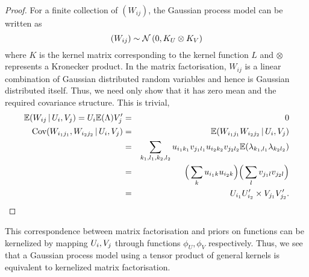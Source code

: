 \begin{proof}
For a finite collection of $(W_{ij})$, the Gaussian process model can be written as
\begin{equation}
(W_{ij}) \sim \mathcal{N}\,(0, K_U \otimes K_V)
\end{equation}
where $K$ is the kernel matrix corresponding to the kernel function $L$ and $\otimes$ represents a Kronecker product.
In the matrix factorisation, $W_{ij}$ is a linear combination of Gaussian distributed random variables and hence is Gaussian distributed itself. Thus, we need only show that it has zero mean and the required covariance structure. This is trivial,
\begin{eqnarray}
\mathbb{E} (W_{ij} \,|\, U_i, V_j) = U_i\mathbb{E}(\Lambda)V_j' & = & 0 \\
\textrm{Cov} (W_{i_1j_1}, W_{i_2j_2} \,|\, U_i, V_j) & = & \mathbb{E} (W_{i_1j_1} W_{i_2j_2} \,|\, U_i, V_j ) \nonumber \\
& = & \sum_{k_1,l_1,k_2,l_2} u_{i_1k_1}v_{j_1l_1}u_{i_2k_2}v_{j_2l_2}\mathbb{E}(\lambda_{k_1,l_1}\lambda_{k_2l_2}) \nonumber \\
& = & \Big(\sum_k u_{i_1k}u_{i_2k}\Big)\Big(\sum_l v_{j_1l}v_{j_2l}\Big) \nonumber \\
& = & U_{i_1}U_{i_2}' \times V_{j_1}V_{j_2}'.
\end{eqnarray}
\end{proof}

This correspondence between matrix factorisation and priors on functions can be kernelized by mapping $U_i, V_j$ through functions $\phi_U, \phi_V$ respectively.
Thus, we see that a Gaussian process model using a tensor product of general kernels is equivalent to kernelized matrix factorisation.

